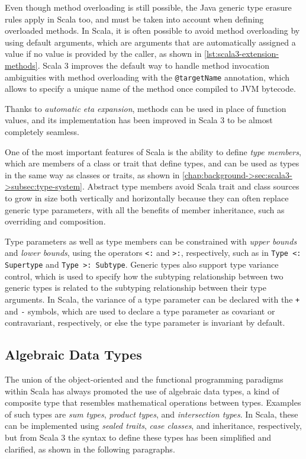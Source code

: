 Even though method overloading is still possible, the Java generic type erasure rules apply in Scala too, and must be taken into account when defining overloaded methods.
%
In Scala, it is often possible to avoid method overloading by using default arguments, which are arguments that are automatically assigned a value if no value is provided by the caller, as shown in \cref{lst:scala3-extension-methods}.
%
Scala 3 improves the default way to handle method invocation ambiguities with method overloading with the \texttt{@targetName} annotation, which allows to specify a unique name of the method once compiled to \ac{JVM} bytecode.

Thanks to \textit{automatic eta expansion}, methods can be used in place of function values, and its implementation has been improved in Scala 3 to be almost completely seamless.

One of the most important features of Scala is the ability to define \textit{type members},
which are members of a class or trait that define types, and can be used as types in the same way as classes or traits, as shown in \cref{chap:background->sec:scala3->subsec:type-system}.
%
Abstract type members avoid Scala trait and class sources to grow in size both vertically and horizontally because they can often replace generic type parameters, with all the benefits of member inheritance, such as overriding and composition.

Type parameters as well as type members can be constrained with \textit{upper bounds} and \textit{lower bounds}, using the operators \texttt{<:} and \texttt{>:}, respectively, such as in \texttt{Type <: Supertype} and \texttt{Type >: Subtype}.
%
Generic types also support type variance control, which is used to specify how the subtyping relationship between two generic types is related to the subtyping relationship between their type arguments.
%
In Scala, the variance of a type parameter can be declared with the \texttt{+} and \texttt{-} symbols, which are used to declare a type parameter as covariant or contravariant, respectively, or else the type parameter is invariant by default.

\subsection{Algebraic Data Types}

The union of the object-oriented and the functional programming paradigms within Scala has always promoted the use of algebraic data types, a kind of composite type that resembles mathematical operations between types.
%
Examples of such types are \textit{sum types}, \textit{product types}, and \textit{intersection types}.
%
In Scala, these can be implemented using \textit{sealed traits}, \textit{case classes}, and inheritance, respectively, but from Scala 3 the syntax to define these types has been simplified and clarified, as shown in the following paragraphs.

